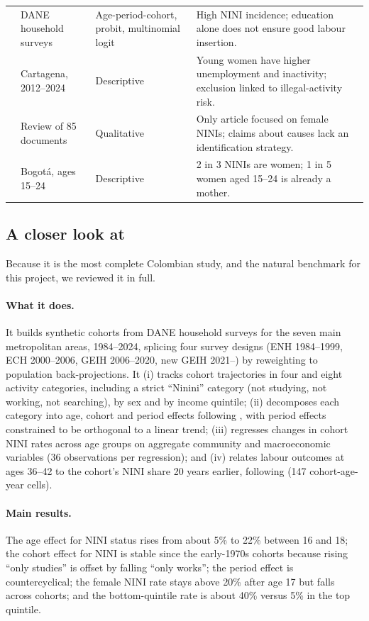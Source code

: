 \documentclass[11pt]{article}
\begin{document}
\begin{longtable}{P{3.0cm}P{3.6cm}P{2.6cm}P{5.6cm}}
\citet{castillo2020} & DANE household surveys & Age-period-cohort, probit, multinomial logit & High NINI incidence; education alone does not ensure good labour insertion. \\
\citet{otero2026} & Cartagena, 2012--2024 & Descriptive & Young women have higher unemployment and inactivity; exclusion linked to illegal-activity risk. \\
\citet{henao2024} & Review of 85 documents & Qualitative & Only article focused on female NINIs; claims about causes lack an identification strategy. \\
\citet{bernal2019} & Bogot\'a, ages 15--24 & Descriptive & 2 in 3 NINIs are women; 1 in 5 women aged 15--24 is already a mother. \\
\end{longtable}
\endgroup

\subsection{A closer look at \citet{lasso2026}}\label{sec:lasso}

Because it is the most complete Colombian study, and the natural benchmark for this project, we reviewed it in full.

\paragraph{What it does.} It builds synthetic cohorts from DANE household surveys for the seven main metropolitan areas, 1984--2024, splicing four survey designs (ENH 1984--1999, ECH 2000--2006, GEIH 2006--2020, new GEIH 2021--) by reweighting to population back-projections. It (i) tracks cohort trajectories in four and eight activity categories, including a strict ``Ninini'' category (not studying, not working, not searching), by sex and by income quintile; (ii) decomposes each category into age, cohort and period effects following \citet{deaton2019}, with period effects constrained to be orthogonal to a linear trend; (iii) regresses changes in cohort NINI rates across age groups on aggregate community and macroeconomic variables (36 observations per regression); and (iv) relates labour outcomes at ages 36--42 to the cohort's NINI share 20 years earlier, following \citet{cruces2012} (147 cohort-age-year cells).

\paragraph{Main results.} The age effect for NINI status rises from about 5\% to 22\% between 16 and 18; the cohort effect for NINI is stable since the early-1970s cohorts because rising ``only studies'' is offset by falling ``only works''; the period effect is countercyclical; the female NINI rate stays above 20\% after age 17 but falls across cohorts; and the bottom-quintile rate is about 40\% versus 5\% in the top quintile.
\end{document}
